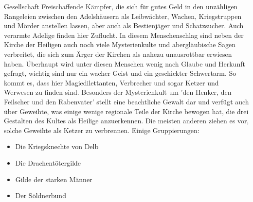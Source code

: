 \documentclass[10pt,twoside,twocolumn,openany]{book}
\newenvironment{mcolsec*}[1]{\section{#1}\begin{multicols}{2}}{
\end{multicols}}
\begin{document}
\begin{mcolsec*}{Gesellschaft}
	Freischaffende Kämpfer, die sich für gutes Geld in den unzähligen Rangeleien zwischen den Adelshäusern als Leibwächter, Wachen, Kriegstruppen und Mörder anstellen lassen, aber auch als Bestienjäger und Schatzsucher. Auch verarmte Adelige finden hier Zuflucht. In diesem Menschenschlag sind neben der Kirche der Heiligen auch noch viele Mysterienkulte und abergläubische Sagen verbreitet, die sich zum Ärger der Kirchen als nahezu unausrottbar erwiesen haben. Überhaupt wird unter diesen Menschen wenig nach Glaube und Herkunft gefragt, wichtig sind nur ein wacher Geist und ein geschickter Schwertarm. So kommt es, dass hier Magiedilettanten, Verbrecher und sogar Ketzer und Werwesen zu finden sind.
	Besonders der Mysterienkult um 'den Henker, den Feilscher und den Rabenvater' stellt eine beachtliche Gewalt dar und verfügt auch über Geweihte, was einige wenige regionale Teile der Kirche bewogen hat, die drei Gestalten des Kultes als Heilige anzuerkennen. Die meisten anderen ziehen es vor, solche Geweihte als Ketzer zu verbrennen.
	Einige Gruppierungen:
	\begin{itemize}
		\item Die Kriegsknechte von Delb
		\item Die Drachentötergilde
		\item Gilde der starken Männer
		\item Der Söldnerbund
	\end{itemize}

\end{mcolsec*}
\end{document}
